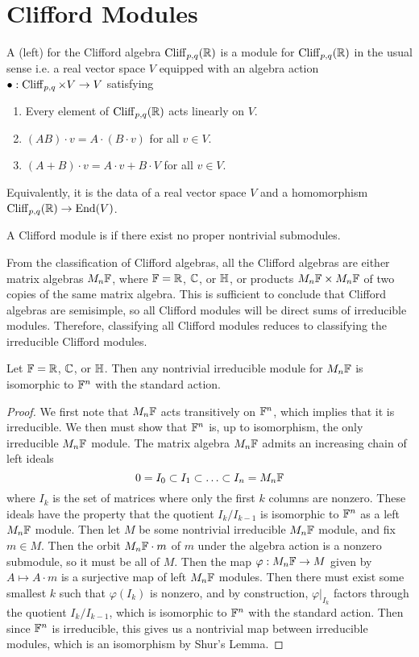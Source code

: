 \section{Clifford Modules}
%
\begin{defn}
A (left)  for the Clifford algebra $\operatorname{Cliff}_{p,q}(\mathbb{R})$ is a module
for $\operatorname{Cliff}_{p,q}(\mathbb{R})$ in the usual sense i.e. a real vector space $V$ equipped
with an algebra action $\bullet: \operatorname{Cliff}_{p,q} \times V \to V$ satisfying
\begin{enumerate}
  \item Every element of $\operatorname{Cliff}_{p,q}(\mathbb{R})$ acts linearly on $V$.
  \item $(AB) \cdot v = A\cdot(B \cdot v)$ for all $v \in V$.
  \item $(A + B) \cdot v = A\cdot v + B\cdot V$ for all $v \in V$.
\end{enumerate}
Equivalently, it is the data of a real vector space $V$ and a homomorphism
$\operatorname{Cliff}_{p,q}(\mathbb{R}) \to \operatorname{End}(V)$.
\end{defn}
%
\begin{defn}
A Clifford module is  if there exist no proper nontrivial submodules.
\end{defn}
%
From the classification of Clifford algebras, all the Clifford algebras are either
matrix algebras $M_n\mathbb{F}$, where $\mathbb{F} = \mathbb{R}$, $\mathbb{C}$, or $\mathbb{H}$, or products
$M_n\mathbb{F} \times M_n\mathbb{F}$ of two copies of the same matrix algebra. This is sufficient
to conclude that Clifford algebras are semisimple, so all Clifford modules
will be direct sums of irreducible modules. Therefore, classifying all Clifford
modules reduces to classifying the irreducible Clifford modules.
%
\begin{thm}
Let $\mathbb{F} = \mathbb{R}$, $\mathbb{C}$, or $\mathbb{H}$. Then any nontrivial irreducible module for
$M_n\mathbb{F}$ is isomorphic to $\mathbb{F}^n$ with the standard action.
\end{thm}
%
\begin{proof}
We first note that $M_n\mathbb{F}$ acts transitively on $\mathbb{F}^n$, which implies that
it is irreducible. We then must show that $\mathbb{F}^n$ is, up to isomorphism, the only
irreducible $M_n\mathbb{F}$ module. The matrix algebra $M_n\mathbb{F}$ admits an increasing
chain of left ideals
\[
0 = I_0 \subset I_1 \subset \ldots \subset I_n = M_n\mathbb{F}
\]
where $I_k$ is the set of matrices where only the first $k$ columns are nonzero.
These ideals have the property that the quotient $I_k / I_{k-1}$ is isomorphic
to $\mathbb{F}^n$ as a left $M_n\mathbb{F}$ module. Then let $M$ be some nontrivial irreducible
$M_n\mathbb{F}$ module, and fix $m \in M$. Then the orbit $M_n\mathbb{F} \cdot m$ of $m$
under the algebra action is a nonzero submodule, so it must be all of $M$.
Then the map $\varphi : M_n\mathbb{F} \to M$ given by $A \mapsto A \cdot m$ is
a surjective map of left $M_n\mathbb{F}$ modules. Then there must exist some smallest
$k$ such that $\varphi(I_k)$ is nonzero, and by construction,
$\varphi\vert_{I_k}$ factors through the quotient $I_k / I_{k-1}$, which
is isomorphic to $\mathbb{F}^n$ with the standard action. Then since $\mathbb{F}^n$ is irreducible,
this gives us a nontrivial map between irreducible modules, which is an isomorphism
by Shur's Lemma.
\end{proof}
